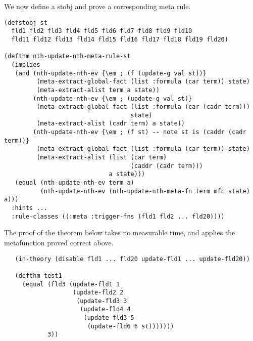 \noindent We now define a stobj and prove a corresponding meta rule.

\begin{Verbatim}[commandchars=\\\{\},fontsize=\small]
(defstobj st
  fld1 fld2 fld3 fld4 fld5 fld6 fld7 fld8 fld9 fld10
  fld11 fld12 fld13 fld14 fld15 fld16 fld17 fld18 fld19 fld20)

(defthm nth-update-nth-meta-rule-st
  (implies
   (and (nth-update-nth-ev {\em ; (f (update-g val st))}
         (meta-extract-global-fact (list :formula (car term)) state)
         (meta-extract-alist term a state))
        (nth-update-nth-ev {\em ; (update-g val st)}
         (meta-extract-global-fact (list :formula (car (cadr term)))
                                   state)
         (meta-extract-alist (cadr term) a state))
        (nth-update-nth-ev {\em ; (f st) -- note st is (caddr (cadr term))}
         (meta-extract-global-fact (list :formula (car term)) state)
         (meta-extract-alist (list (car term)
                                   (caddr (cadr term)))
                             a state)))
   (equal (nth-update-nth-ev term a)
          (nth-update-nth-ev (nth-update-nth-meta-fn term mfc state) a)))
  :hints ...
  :rule-classes ((:meta :trigger-fns (fld1 fld2 ... fld20))))
\end{Verbatim}

\noindent The proof of the theorem below takes no measurable time, and
applies the metafunction proved correct above.

\begin{verbatim}
   (in-theory (disable fld1 ... fld20 update-fld1 ... update-fld20))

   (defthm test1
     (equal (fld3 (update-fld1 1
                   (update-fld2 2
                    (update-fld3 3
                     (update-fld4 4
                      (update-fld3 5
                       (update-fld6 6 st)))))))
            3))
\end{verbatim}

